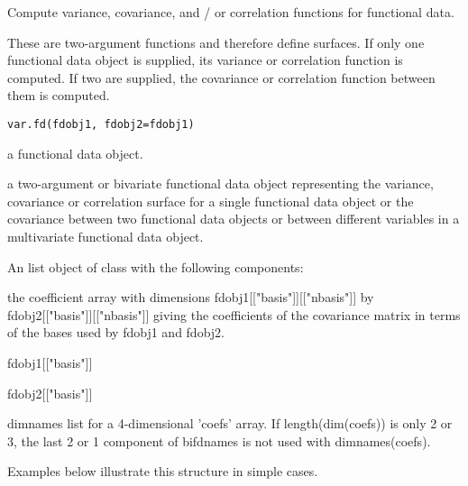 \documentclass{article}
\begin{document}
\begin{Description}\relax
Compute variance, covariance, and / or correlation functions for
functional data.  

These are two-argument functions and therefore define surfaces. If
only one functional data object is supplied, its variance or
correlation function is computed.  If two are supplied, the covariance
or correlation function between them is 
computed.
\end{Description}
\begin{Usage}
\begin{verbatim}
var.fd(fdobj1, fdobj2=fdobj1)
\end{verbatim}
\end{Usage}
\begin{Arguments}
\begin{ldescription}
\item[\code{fdobj1, fdobj2}] a functional data object.

\end{ldescription}
\end{Arguments}
\begin{Details}\relax
a two-argument or bivariate functional data object representing the
variance, covariance or correlation surface for a single functional
data object or the covariance between two functional data objects or
between different variables in a multivariate functional data object.
\end{Details}
\begin{Value}
An list object of class  with the following components:

\begin{ldescription}
\item[\code{coefs}] the coefficient array with dimensions fdobj1[["basis"]][["nbasis"]]
by fdobj2[["basis"]][["nbasis"]] giving the coefficients of the 
covariance matrix in terms of the bases used by fdobj1 and
fdobj2.  

\item[\code{sbasis}] fdobj1[["basis"]]

\item[\code{tbasis}] fdobj2[["basis"]]

\item[\code{bifdnames}] dimnames list for a 4-dimensional 'coefs' array.  If
length(dim(coefs)) is only 2 or 3, the last 2 or 1 component of
bifdnames is not used with dimnames(coefs).  

\end{ldescription}


Examples below illustrate this structure in simple
cases.
\end{Value}
\end{document}
